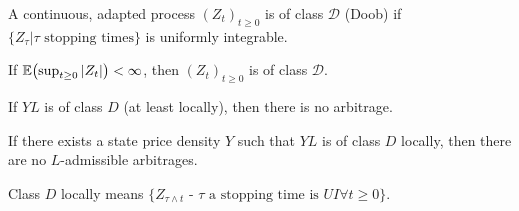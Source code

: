 \begin{defn}
  \label{defn:continuous_time:24}
  A continuous, adapted process $(Z_{t})_{t \geq 0}$ is of class
  $\mathcal{D}$ (Doob) if $\{ Z_{\tau} | \text{$\tau$ stopping times}
  \}$ is uniformly integrable.
\end{defn}

\begin{remark}
  If $\E{\sup_{t \geq 0} |Z_{t}|} < \infty$, then $(Z_{t})_{t \geq 0}$
  is of class $\mathcal{D}$.
\end{remark}

\begin{thm}
  \label{defn:continuous_time:25}
  If $YL$ is of class $D$ (at least locally), then there is no arbitrage.
\end{thm}

\begin{thm}
  \label{defn:continuous_time:26}
  If there exists a state price density $Y$ such that $YL$ is of class
  $D$ locally, then there are no $L$-admissible arbitrages.

  Class $D$ locally means $\{ \text{$Z_{\tau \wedge t}$ - $\tau$ a
    stopping time is $UI \forall t \geq 0$} \}$.
\end{thm}

